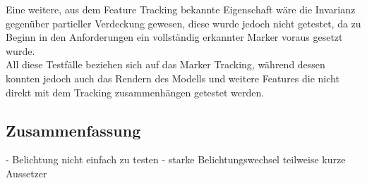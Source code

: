 Eine weitere, aus dem Feature Tracking bekannte Eigenschaft wäre die Invarianz gegenüber partieller Verdeckung gewesen, diese wurde jedoch nicht getestet, da zu Beginn in den Anforderungen ein vollständig erkannter Marker voraus gesetzt wurde.\\
All diese Testfälle beziehen sich auf das Marker Tracking, während dessen konnten jedoch auch das Rendern des Modells und weitere Features die nicht direkt mit dem Tracking zusammenhängen getestet werden.\\

\subsection{Zusammenfassung}\label{sec:Zusammenfassung}
- Belichtung nicht einfach zu testen
- starke Belichtungswechsel teilweise kurze Aussetzer


